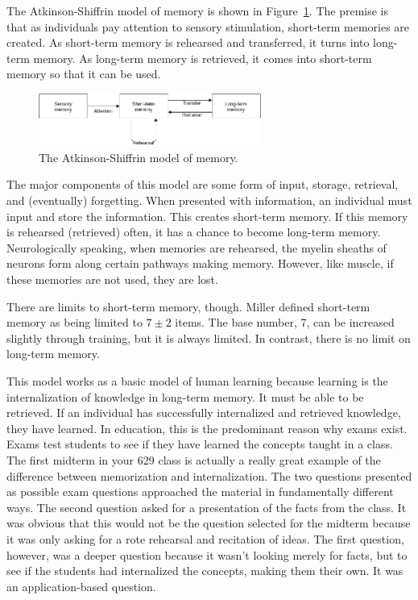 \documentclass[12pt]{article}
\begin{document}
The Atkinson-Shiffrin model of memory is shown in Figure~\ref{fig:memory-model}. The premise is that as individuals pay attention to sensory stimulation, short-term memories are created. As short-term memory is rehearsed and transferred, it turns into long-term memory. As long-term memory is retrieved, it comes into short-term memory so that it can be used.

\begin{figure}[h]
    \centering
    \includegraphics[width=0.65\textwidth]{memory-model}
    \caption{The Atkinson-Shiffrin model of memory.}
    \label{fig:memory-model}
\end{figure}

The major components of this model are some form of input, storage, retrieval, and (eventually) forgetting. When presented with information, an individual must input and store the information. This creates short-term memory. If this memory is rehearsed (retrieved) often, it has a chance to become long-term memory. Neurologically speaking, when memories are rehearsed, the myelin sheaths of neurons form along certain pathways making memory. However, like muscle, if these memories are not used, they are lost.

There are limits to short-term memory, though. Miller defined short-term memory as being limited to $7\pm2$ items. The base number, 7, can be increased slightly through training, but it is always limited. In contrast, there is no limit on long-term memory.

This model works as a basic model of human learning because learning is the internalization of knowledge in long-term memory. It must be able to be retrieved. If an individual has successfully internalized and retrieved knowledge, they have learned. In education, this is the predominant reason why exams exist. Exams test students to see if they have learned the concepts taught in a class. The first midterm in your 629 class is actually a really great example of the difference between memorization and internalization. The two questions presented as possible exam questions approached the material in fundamentally different ways. The second question asked for a presentation of the facts from the class. It was obvious that this would not be the question selected for the midterm because it was only asking for a rote rehearsal and recitation of ideas. The first question, however, was a deeper question because it wasn't looking merely for facts, but to see if the students had internalized the concepts, making them their own. It was an application-based question.
\end{document}

